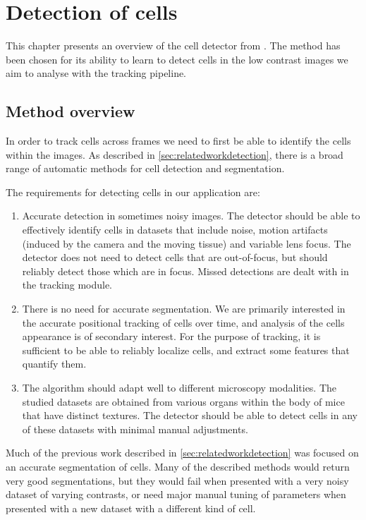 \chapter{Detection of cells}
	\label{chap:cell_detection}
	
	
	This chapter presents an overview of the cell detector from \cite{arteta12}. The method has been chosen for its ability to learn to detect cells in the low contrast images we aim to analyse with the tracking pipeline.
	
	\section{Method overview}
	
	In order to track cells across frames we need to first be able to identify the cells within the images. As described in \cref{sec:relatedworkdetection}, there is a broad range of automatic methods for cell detection and segmentation.
	
	The requirements for detecting cells in our application are:
		
	\begin{enumerate}
	\item Accurate detection in sometimes noisy images. The detector should be able to effectively identify cells in datasets that include noise, motion artifacts (induced by the camera and the moving tissue) and variable lens focus. The detector does not need to detect cells that are out-of-focus, but should reliably detect those which are in focus. Missed detections are dealt with in the tracking module.
	
	\item There is no need for accurate segmentation. We are primarily interested in the accurate positional tracking of cells over time, and analysis of the cells appearance is of secondary interest. For the purpose of tracking, it is sufficient to be able to reliably localize cells, and extract some features that quantify them.
	
	\item The algorithm should adapt well to different microscopy modalities. The studied datasets are obtained from various organs within the body of mice that have distinct textures. The detector should be able to detect cells in any of these datasets with minimal  manual adjustments.
	\end{enumerate}
	
	Much of the previous work described in \cref{sec:relatedworkdetection} was focused on an accurate segmentation of cells. Many of the described methods would return very good segmentations, but they would fail when presented with a very noisy dataset of varying contrasts, or need major manual tuning of parameters when presented with a new dataset with a different kind of cell.
	

